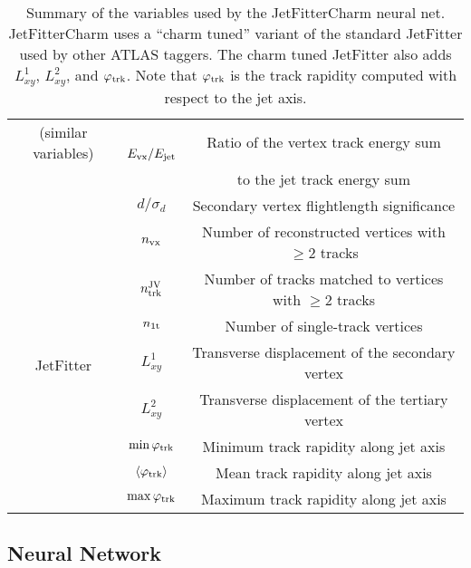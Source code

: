 \begin{table}
\begin{tabular}{c | c | c }
  (similar variables)& \multirow{2}{*}{$E_{\rm vx}/E_{\rm jet}$}  & Ratio of the vertex track energy sum \\
                         &                  & to the jet track energy sum \\
                          & $d / \sigma_{d}$ & Secondary vertex flightlength significance \\
    \hline
    \multirow{8}{*}{JetFitter}
                          & $n_{\rm vx}$      & Number of reconstructed vertices with  $\ge 2$ tracks \\
                          & $n_{\rm trk}^{\rm JV}$     & Number of tracks matched to vertices with $\ge 2$ tracks \\
                          & $n_{\rm 1t}$      & Number of single-track vertices\\
                          & $L_{xy}^{1}$ & Transverse displacement of the secondary vertex \\
                          & $L_{xy}^{2}$ & Transverse displacement of the tertiary vertex \\
                          & $\min \varphi_{\rm trk}$ & Minimum track rapidity along jet axis \\
                          & $\langle \varphi_{\rm trk} \rangle$ & Mean track rapidity along jet axis \\
                          & $\max \varphi_{\rm trk} $ & Maximum track rapidity along jet axis \\

  \end{tabular}
  \caption[Variable summary table]{Summary of the variables used by the JetFitterCharm neural net. JetFitterCharm uses a ``charm tuned'' variant of the standard JetFitter used by other ATLAS taggers. The charm tuned JetFitter also adds $L_{xy}^1$, $L_{xy}^2$, and $\varphi_{\rm trk}$. Note that $\varphi_{\rm trk}$ is the track rapidity computed with respect to the jet axis.}
  \label{tag:tab:parameters}
\end{table}

\subsection{Neural Network}

